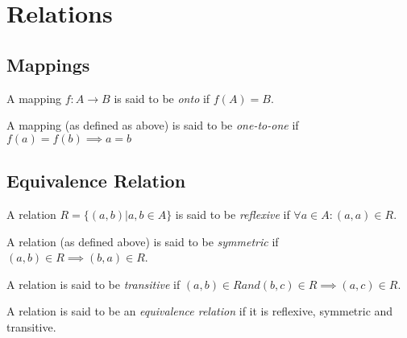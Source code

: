 \chapter{Relations}

\section{Mappings}

A mapping $f : A \rightarrow B$ is said to be \emph{onto} if $ f(A) = B $.

A mapping (as defined as above) is said to be \emph{one-to-one} if
$ f(a) = f(b) \implies a = b $

\section{Equivalence Relation}

A relation $ R = \{ (a,b) | a,b \in A \} $ is said to be
\emph{reflexive} if $ \forall a \in A: (a,a) \in R $.

A relation (as defined above) is said to be \emph{symmetric} if $
(a,b) \in R \implies (b,a) \in R $.

A relation is said to be \emph{transitive} if $ (a,b) \in R and (b,c)
\in R \implies (a,c) \in R $.

A relation is said to be an \emph{equivalence relation} if it is
reflexive, symmetric and transitive.

